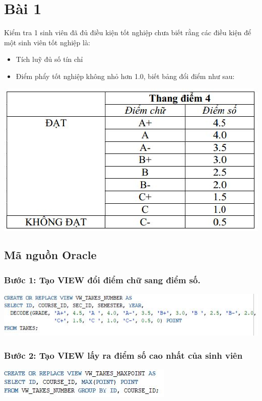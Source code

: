 \documentclass[12pt,a4paper]{report}
\begin{document}
\section{Bài 1}
\begin{boxedminipage}[t]{15.5cm}
Kiểm tra 1 sinh viên đã đủ điều kiện tốt nghiệp chưa biết rằng các điều kiện để một sinh viên tốt nghiệp là:
\begin{itemize}
	\item Tích luỹ đủ số tín chỉ
	\item Điểm phẩy tốt nghiệp không nhỏ hơn 1.0, biết bảng đổi điểm như sau:	
\end{itemize}	
		\begin{center}
		\includegraphics[scale=.7]{bang.jpg}
		
	\end{center}
\end{boxedminipage}
\subsection{Mã nguồn Oracle}
\subsubsection{Bước 1: Tạo VIEW đổi điểm chữ sang điểm số.} 
\includegraphics[scale=1]{b1v1.jpg}
\subsubsection{Bước 2: Tạo VIEW lấy ra điểm số cao nhất của sinh viên} 
\includegraphics[scale=1]{b1v2.jpg}
\end{document}
